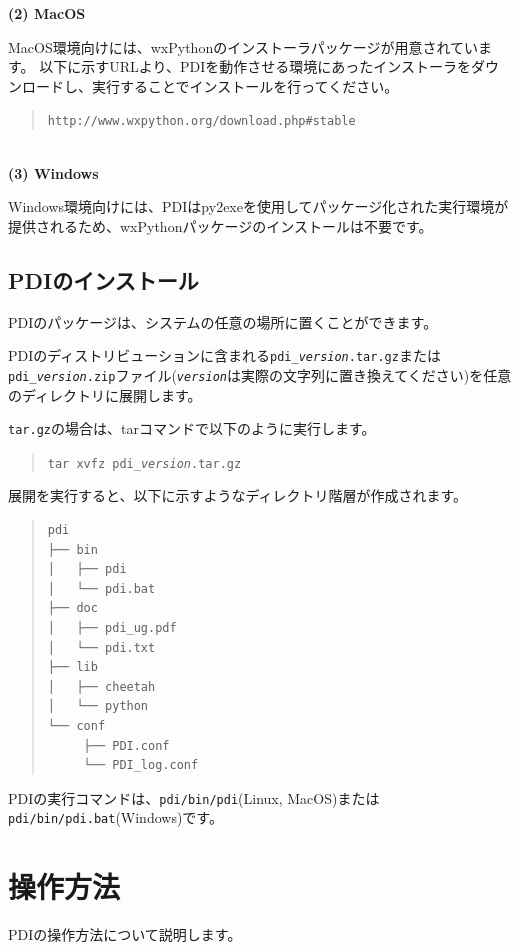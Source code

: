 \documentclass[a4paper,11pt]{jarticle}
\begin{document}
\textbf{(2) MacOS}

MacOS環境向けには、wxPythonのインストーラパッケージが用意されています。
以下に示すURLより、PDIを動作させる環境にあったインストーラをダウンロードし、実行することでインストールを行ってください。
\begin{quote}
{\tt http://www.wxpython.org/download.php\#stable}
\end{quote}
{\ }\\


\textbf{(3) Windows}

Windows環境向けには、PDIはpy2exeを使用してパッケージ化された実行環境が提供されるため、wxPythonパッケージのインストールは不要です。
{\ }\\


\subsection{PDIのインストール}

PDIのパッケージは、システムの任意の場所に置くことができます。

PDIのディストリビューションに含まれる{\tt pdi\_{\it version}.tar.gz}または{\tt pdi\_{\it version}.zip}ファイル({\tt\it version}は実際の文字列に置き換えてください)を任意のディレクトリに展開します。

{\tt tar.gz}の場合は、tarコマンドで以下のように実行します。

\begin{quote}
{\tt tar xvfz  pdi\_\textit{version}.tar.gz}
\end{quote}


展開を実行すると、以下に示すようなディレクトリ階層が作成されます。

\begin{quote}
\begin{verbatim}
pdi
├── bin
│   ├── pdi
│   └── pdi.bat
├── doc
│   ├── pdi_ug.pdf
│   └── pdi.txt
├── lib
│   ├── cheetah
│   └── python
└── conf
     ├── PDI.conf
     └── PDI_log.conf
\end{verbatim}
\end{quote}

PDIの実行コマンドは、{\tt pdi/bin/pdi}(Linux, MacOS)または{\tt pdi/bin/pdi.bat}(Windows)です。

\newpage
\section{操作方法}

PDIの操作方法について説明します。
\end{document}
